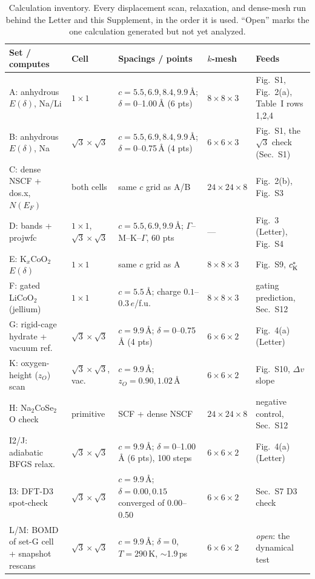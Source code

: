 \documentclass[aps,10pt,preprint,superscriptaddress,floatfix]{revtex4-2}
\begin{document}
\begin{table}[p]
  \caption{Calculation inventory. Every displacement scan, relaxation, and dense-mesh run behind
  the Letter and this Supplement, in the order it is used. ``Open'' marks the one calculation
  generated but not yet analyzed.}
  \label{tab:inventory}
  \scriptsize
  \renewcommand{\arraystretch}{1.35}%
  \begin{tabular}{@{}p{3.4cm}p{2.0cm}p{4.2cm}p{1.9cm}p{4.4cm}@{}}
    \toprule
    \textbf{Set / computes} & \textbf{Cell} & \textbf{Spacings / points} &
    \textbf{$k$-mesh} & \textbf{Feeds}\\
    \midrule
    A: anhydrous $E(\delta)$, Na/Li & $1\times1$ & $c=5.5,6.9,8.4,9.9$\,\AA;
      $\delta=0$--1.00\,\AA{} (6 pts) & $8\times8\times3$ &
      Fig.~S1, Fig.~2(a), Table~I rows 1,2,4\\
    B: anhydrous $E(\delta)$, Na & $\sqrt3\times\sqrt3$ & $c=5.5,6.9,8.4,9.9$\,\AA;
      $\delta=0$--0.75\,\AA{} (4 pts) & $6\times6\times3$ &
      Fig.~S1, the $\sqrt3$ check (Sec.~S1)\\
    C: dense NSCF + dos.x, $N(E_F)$ & both cells & same $c$ grid as A/B &
      $24\times24\times8$ & Fig.~2(b), Fig.~S3\\
    D: bands + {\sc projwfc} & $1\times1$, $\sqrt3\times\sqrt3$ &
      $c=5.5,6.9,9.9$\,\AA; $\Gamma$--M--K--$\Gamma$, 60 pts & --- &
      Fig.~3 (Letter), Fig.~S4\\
    E: K$_x$CoO$_2$ $E(\delta)$ & $1\times1$ & same $c$ grid as A &
      $8\times8\times3$ & Fig.~S9, $c^\ast_{\rm K}$\\
    F: gated LiCoO$_2$ (jellium) & $1\times1$ & $c=5.5$\,\AA; charge $0.1$--$0.3\,e$/f.u. &
      $8\times8\times3$ & gating prediction, Sec.~S12\\
    G: rigid-cage hydrate + vacuum ref. & $\sqrt3\times\sqrt3$ &
      $c=9.9$\,\AA; $\delta=0$--0.75\,\AA{} (4 pts) & $6\times6\times2$ &
      Fig.~4(a) (Letter)\\
    K: oxygen-height ($z_O$) scan & $\sqrt3\times\sqrt3$, vac. &
      $c=9.9$\,\AA; $z_O=0.90,1.02$\,\AA & $6\times6\times2$ &
      Fig.~S10, $\Delta v$ slope\\
    H: Na$_2$CoSe$_2$O check & primitive & SCF + dense NSCF &
      $24\times24\times8$ & negative control, Sec.~S12\\
    I2/J: adiabatic BFGS relax. & $\sqrt3\times\sqrt3$ &
      $c=9.9$\,\AA; $\delta=0$--1.00\,\AA{} (6 pts), 100 steps & $6\times6\times2$ &
      Fig.~4(a) (Letter)\\
    I3: DFT-D3 spot-check & $\sqrt3\times\sqrt3$ &
      $c=9.9$\,\AA; $\delta=0.00,0.15$ converged of 0.00--0.50 & $6\times6\times2$ &
      Sec.~S7 D3 check\\
    L/M: BOMD of set-G cell + snapshot rescans & $\sqrt3\times\sqrt3$ &
      $c=9.9$\,\AA; $\delta=0$, $T=290$\,K, $\sim$1.9\,ps & $6\times6\times2$ &
      \emph{open}: the dynamical test\\
    \bottomrule
  \end{tabular}
\end{table}
\end{document}
